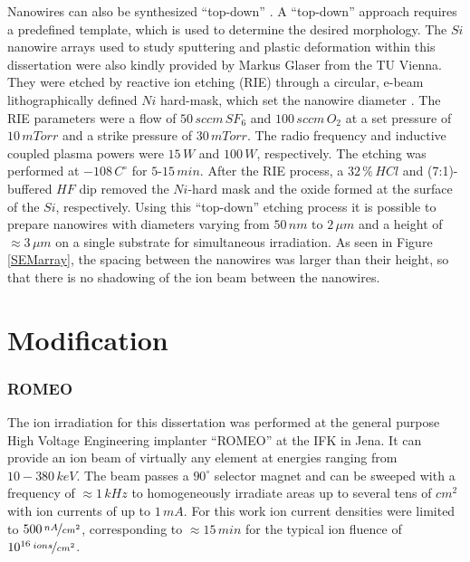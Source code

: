 Nanowires can also be synthesized ``top-down'' \cite{haginoya_nanostructure_1997,hausmann_fabrication_2010}. A ``top-down'' approach requires a predefined template, which is used to determine the desired morphology. The $Si$ nanowire arrays used to study sputtering and plastic deformation within this dissertation were also kindly provided by Markus Glaser from the TU Vienna. They were etched by reactive ion etching (RIE) through a circular, e-beam lithographically defined $Ni$ hard-mask, which set the nanowire diameter \cite{johannes_anomalous_2015}. The RIE parameters were a flow of $50\,sccm\,SF_6$ and $100\,sccm\,O_2$ at a set pressure of $10\,mTorr$ and a strike pressure of $30\,mTorr$. The radio frequency and inductive coupled plasma powers were $15\,W$ and $100\,W$, respectively. The etching was performed at $-108\,C^\circ$ for $5$-$15\,min$. After the RIE process, a $32\,\%\,HCl$ and (7:1)-buffered $HF$ dip removed the $Ni$-hard mask and the oxide formed at the surface of the $Si$, respectively. Using this ``top-down'' etching process it is possible to prepare nanowires with diameters varying from $50\,nm$ to $2\,\mu m$ and a height of $\approx 3\,\mu m$ on a single substrate for simultaneous irradiation. As seen in Figure \ref{SEMarray}, the spacing between the nanowires was larger than their height, so that there is no shadowing of the ion beam between the nanowires.



\section{Modification}


\subsubsection{ROMEO}


The ion irradiation for this dissertation was performed at the general purpose High Voltage Engineering implanter ``ROMEO'' at the IFK in Jena. It can provide an ion beam of virtually any element at energies ranging from $10-380\,keV$. The beam passes a $90^\circ$ selector magnet and can be sweeped with a frequency of $\approx 1\,kHz$ to homogeneously irradiate areas up to several tens of $cm^2$ with ion currents of up to $1\,mA$. For this work ion current densities were limited to $500\,\nicefrac{nA}{cm^2}$, corresponding to $\approx 15\,min$ for the typical ion fluence of $10^{16}\,\nicefrac{ions}{cm^2}$.

